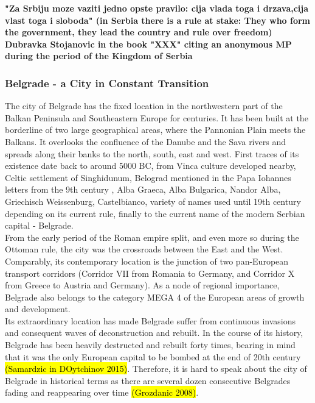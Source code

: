 \documentclass[11pt]{report}
\begin{document}
\textbf{"Za Srbiju moze vaziti jedno opste pravilo: cija vlada toga i drzava,cija vlast toga i sloboda" (in Serbia there is a rule at stake: They who form the government, they lead the country and rule over freedom) Dubravka Stojanovic in the book "XXX" citing an anonymous MP during the period of the Kingdom of Serbia}

\subsubsection{Belgrade - a City in Constant Transition}

The city of Belgrade has the fixed location in the northwestern part of the Balkan Peninsula and Southeastern Europe for centuries. It  has  been  built  at  the borderline of two large geographical areas, where the Pannonian Plain meets the Balkans. It overlooks the confluence of the Danube and the Sava rivers and spreads along their banks to the north, south, east and west. First traces of its existence date back to around 5000 BC, from Vinca culture developed nearby, Celtic settlement of Singhidunum, Belograd mentioned in the Papa Iohannes letters from the 9th century , Alba  Graeca,  Alba  Bulgarica,  Nandor  Alba,  Griechisch Weissenburg, Castelbianco, variety of names used until 19th century depending on its current rule, finally to the current name of the modern Serbian capital - Belgrade.
\\
From the early period of the Roman empire split, and even more so during the Ottoman rule, the city was the crossroads between the East and the West. Comparably, its contemporary location is the junction of two pan-European transport corridors (Corridor VII from Romania to Germany, and Corridor X from Greece to Austria and Germany). As a node of regional importance, Belgrade also belongs to the category MEGA 4 of the European areas of growth and development.
\\
Its extraordinary location has made Belgrade suffer from continuous invasions and consequent waves of deconstruction and rebuilt. In the course of its history, Belgrade has been heavily destructed and rebuilt forty times, bearing in mind that it was the only European capital to be bombed at the end of 20th century \hl{(Samardzic in DOytchinov 2015)}. Therefore, it is hard to speak about the city of Belgrade in historical terms as there are several  dozen  consecutive  Belgrades fading and reappearing over time \hl{(Grozdanic 2008)}.
\end{document}
